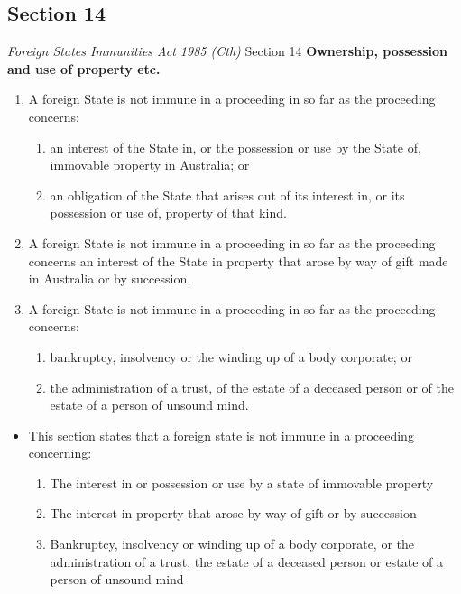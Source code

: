 \subsection{Section 14}
\begin{statutedetails}{\textit{Foreign States Immunities Act 1985 (Cth)} Section 14}
    \flushleft
    \textbf{Ownership, possession and use of property etc.}
    \begin{enumerate}
        \item A foreign State is not immune in a proceeding in so far as the proceeding concerns:
        \begin{enumerate}
            \item an interest of the State in, or the possession or use by the State of, immovable property in Australia; or
            \item an obligation of the State that arises out of its interest in, or its possession or use of, property of that kind.
        \end{enumerate}
        \item A foreign State is not immune in a proceeding in so far as the proceeding concerns an interest of the State in property that arose by way of gift made in Australia or by succession.
        \item A foreign State is not immune in a proceeding in so far as the proceeding concerns:
        \begin{enumerate}
            \item bankruptcy, insolvency or the winding up of a body corporate; or
            \item the administration of a trust, of the estate of a deceased person or of the estate of a person of unsound mind.
        \end{enumerate}
    \end{enumerate}
\end{statutedetails}

\begin{itemize}
    \item This section states that a foreign state is not immune in a proceeding concerning:
    \begin{enumerate}
        \item The interest in or possession or use by a state of immovable property
        \item The interest in property that arose by way of gift or by succession
        \item Bankruptcy, insolvency or winding up of a body corporate, or the administration of a trust, the estate of a deceased person or estate of a person of unsound mind
    \end{enumerate}
\end{itemize}

